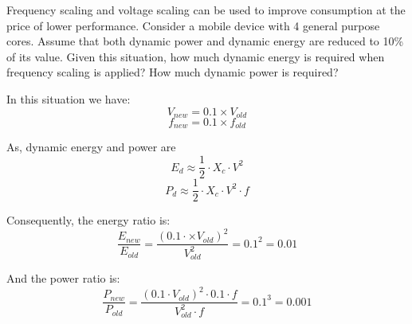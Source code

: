\begin{acexercise}
\end{acexercise}

Frequency scaling and voltage scaling can be used to improve consumption at the
price of lower performance. Consider a mobile device with 4 general purpose
cores.  Assume that both dynamic power and dynamic energy are reduced to 10\%
of its value.  Given this situation, how much dynamic energy is required when
frequency scaling is applied? How much dynamic power is required?

\begin{acsolution}
\end{acsolution}

In this situation we have:
\[V_{new} = 0.1 \times V_{old}\]
\[f_{new} = 0.1 \times f_{old}\]

As, dynamic energy and power are
\[
E_d \approx \frac{1}{2} \cdot X_c \cdot V^2
\]
\[
P_d \approx \frac{1}{2} \cdot X_c \cdot V^2 \cdot f
\]

Consequently, the energy ratio is:
\[
\frac{E_{new}}{E_{old}} =
\frac{(0.1 \cdot \times V_{old})^2}{V_{old}^2} =
0.1^2 =
0.01
\] 

And the power ratio is:
\[
\frac{P_{new}}{P_{old}} =
\frac{(0.1 \cdot V_{old})^2 \cdot 0.1 \cdot f}{V_{old}^2 \cdot f} =
0.1^3 =
0.001
\]
